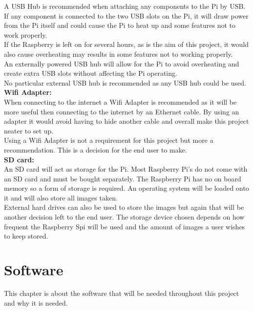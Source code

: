 \documentclass[12pt]{report}
\begin{document}
A USB Hub is recommended when attaching any components to the Pi by USB. If any component is connected to the two USB slots on the Pi, it will draw power from the Pi itself and could cause the Pi to heat up and some features not to work properly. \\

If the Raspberry is left on for several hours, as is the aim of this project, it would also cause overheating may results in some features not to working properly.\\ 


An externally powered USB hub will allow for the Pi to avoid overheating and create extra USB slots without affecting the Pi operating.\\ 

No particular external USB hub is recommended as any USB hub could be used.\\

\noindent
{\bf Wifi Adapter:}\\
\break
When connecting to the internet a Wifi Adapter is recommended as it will be more useful then connecting to the internet by an Ethernet cable. By using an adapter it would avoid having to hide another cable and overall make this project neater to set up.\\

Using a Wifi Adapter is not a requirement for this project but  more a recommendation. This is a decision for the end user to make.\\

\noindent
{\bf SD card:}\\
\break
An SD card will act as storage for the Pi. Most Raspberry Pi's do not come with an SD card and must be bought separately. The Raspberry Pi has no on board memory so a form of storage is required. An operating system will be loaded onto it and will also store all images taken.\\

External hard drives can also be used to store the images but again that will be another decision left to the end user. The storage device chosen depends on how frequent the Raspberry Spi will be used and the amount of images a user wishes to keep stored.\\



\clearpage
\section{Software}	
\label{sec:software}	
This chapter is about the software that will be needed throughout this project and why it is needed.\\
\end{document}
